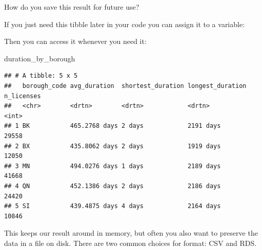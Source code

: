 \documentclass[]{Nemilov}
\newenvironment{Shaded}{\begin{snugshade}}{\end{snugshade}}
\newcommand{\DataTypeTok}[1]{\textcolor[rgb]{0.13,0.29,0.53}{#1}}
\newcommand{\DecValTok}[1]{\textcolor[rgb]{0.00,0.00,0.81}{#1}}
\newcommand{\KeywordTok}[1]{\textcolor[rgb]{0.13,0.29,0.53}{\textbf{#1}}}
\newcommand{\NormalTok}[1]{#1}
\newcommand{\OperatorTok}[1]{\textcolor[rgb]{0.81,0.36,0.00}{\textbf{#1}}}
\newcommand{\StringTok}[1]{\textcolor[rgb]{0.31,0.60,0.02}{#1}}
\begin{document}
How do you save this result for future use?

If you just need this tibble later in your code you can assign it to a variable:

\begin{Shaded}
\end{Shaded}

Then you can access it whenever you need it:

\begin{Shaded}
\begin{Highlighting}[]
\NormalTok{duration_by_borough}
\end{Highlighting}
\end{Shaded}

\begin{verbatim}
## # A tibble: 5 x 5
##   borough_code avg_duration  shortest_duration longest_duration n_licenses
##   <chr>        <drtn>        <drtn>            <drtn>                <int>
## 1 BK           465.2768 days 2 days            2191 days             29558
## 2 BX           435.8062 days 2 days            1919 days             12050
## 3 MN           494.0276 days 1 days            2189 days             41668
## 4 QN           452.1386 days 2 days            2186 days             24420
## 5 SI           439.4875 days 4 days            2164 days             10846
\end{verbatim}

This keeps our result around in memory, but often you also want to preserve the data in a file on disk. There are two common choices for format: CSV and RDS.
\end{document}
